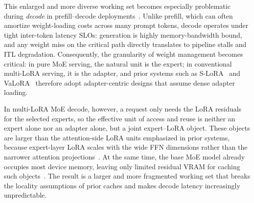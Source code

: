 \documentclass[sigplan,anonymous,review,10pt]{acmart}
\begin{document}

This enlarged and more diverse working set becomes especially problematic during \emph{decode} in prefill--decode deployments~\cite{agrawal2023sarathi,patel2024splitwise}. Unlike prefill, which can often amortize weight-loading costs across many prompt tokens, decode operates under tight inter-token latency SLOs: generation is highly memory-bandwidth bound, and any weight miss on the critical path directly translates to pipeline stalls and ITL degradation. Consequently, the granularity of weight management becomes critical: in pure MoE serving, the natural unit is the expert; in conventional multi-LoRA serving, it is the adapter, and prior systems such as S-LoRA~\cite{sheng2024slora} and VaLoRA~\cite{mi2025empower} therefore adopt adapter-centric designs that assume dense adapter loading.

In multi-LoRA MoE decode, however, a request only needs the LoRA residuals for the selected experts, so the effective unit of access and reuse is neither an expert alone nor an adapter alone, but a joint expert--LoRA object. These objects are larger than the attention-side LoRA units emphasized in prior systems, because expert-layer LoRA scales with the wide FFN dimensions rather than the narrower attention projections~\cite{shazeer2017outrageously}. At the same time, the base MoE model already occupies most device memory, leaving only limited residual VRAM for caching such objects~\cite{zhu2024deepseek}. The result is a larger and more fragmented working set that breaks the locality assumptions of prior caches and makes decode latency increasingly unpredictable.
\end{document}
